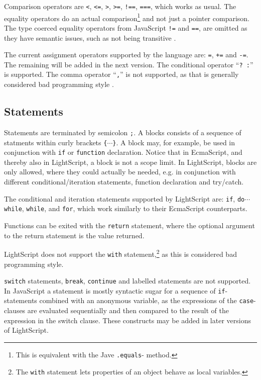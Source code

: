 \documentclass[11pt]{report}
\begin{document}
Comparison operators are \verb|<|, \verb|<=|, \verb|>|, \verb|>=|, \verb|!==|, \verb|===|, which works as usual. The equality operators do an actual comparison\footnote{This is equivalent with the Jave {\tt .equals}- method.} and not just a pointer comparison. 
The type coerced equality operators from JavaScript \verb|!=| and \verb|==|, are omitted 
as they have semantic issues, such as not being transitive \cite{javascriptnoeqeq}.

The current assignment operators supported by the language are: \verb|=|, \verb|+=| and \verb|-=|.
The remaining will be added in the next version.
The conditional operator ``\verb|? :|'' is supported. The comma operator ``\verb|,|'' is not supported, as that is generally considered bad programming style \cite{crockford-web}.

\subsection{Statements}
Statements are terminated by semicolon \verb|;|.
A blocks consists of a sequence of statments within curly brackets \verb|{|$\cdots$\verb|}|. A block may, for example, be used in conjunction with \verb|if| or \verb|function| declaration. Notice that in EcmaScript, and thereby also in LightScript, a block is not a scope limit. In LightScript, blocks are only allowed, where they could actually be needed, e.g. in conjunction with different conditional/iteration statements, function declaration and try/catch.

The conditional and iteration statements supported by LightScript are: \verb|if|, \verb|do|$\cdots$\verb|while|, \verb|while|, and \verb|for|, which work similarly to their EcmaScript counterparts.

Functions can be exited with the \verb|return| statement, where the optional argument to the return statement is the value returned.

LightScript does not support the \verb|with| statement,\footnote{The {\tt with} statement lets properties of an object behave as local variables.} as this is considered bad programming style.

\verb|switch| statements, \verb|break|, \verb|continue| and labelled statements are not supported. In JavaScript a statement is mostly syntactic sugar for a sequence of \verb|if|-statements combined with an anonymous variable, as the expressions of the \verb|case|-clauses are evaluated sequentially and then compared to the result of the expression in the switch clause.
These constructs may be added in later versions of LightScript.
\end{document}
